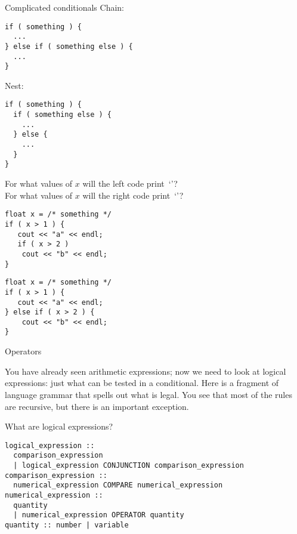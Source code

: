 \begin{slide}{Complicated conditionals}
  \label{sl:elseif}
  Chain:
\begin{lstlisting}
if ( something ) {
  ...
} else if ( something else ) {
  ...
}
\end{lstlisting}
Nest:
\begin{lstlisting}
if ( something ) {
  if ( something else ) {
    ...
  } else {
    ...
  }
}
\end{lstlisting}
\end{slide}

\begin{exercise}
  \label{ex:if-scope-ab}
  For what values of $x$ will the left code print~`'?\\
  For what values of $x$ will the right code print~`'?
  \begin{multicols}{2}
\begin{lstlisting}
float x = /* something */
if ( x > 1 ) {
   cout << "a" << endl;
   if ( x > 2 )
    cout << "b" << endl;
}
\end{lstlisting}
\columnbreak
\begin{lstlisting}
float x = /* something */
if ( x > 1 ) {
   cout << "a" << endl;
} else if ( x > 2 ) {
    cout << "b" << endl;
}
\end{lstlisting}
  \end{multicols}
\end{exercise}

 {Operators}

You have already seen arithmetic expressions; now we need to look at
logical expressions: just what can be tested in a conditional. 
Here is a fragment of language grammar that spells out what is
legal. You see that most of the rules are recursive, but there is an
important exception.

\begin{block}{What are logical expressions?}
  \label{sl:logical-syntax}
\begin{verbatim}
logical_expression :: 
  comparison_expression
  | logical_expression CONJUNCTION comparison_expression
comparison_expression :: 
  numerical_expression COMPARE numerical_expression
numerical_expression :: 
  quantity
  | numerical_expression OPERATOR quantity
quantity :: number | variable
\end{verbatim}
\end{block}

